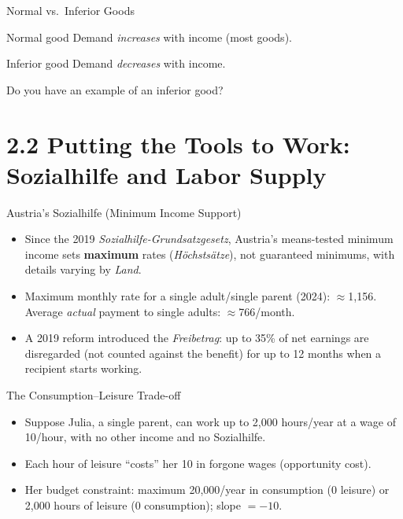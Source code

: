 \documentclass[11pt,aspectratio=169]{beamer}
\begin{document}
\begin{frame}{Normal vs.\ Inferior Goods}
  \begin{block}{Normal good}
    Demand \emph{increases} with income (most goods).
  \end{block}
  \begin{block}{Inferior good}
    Demand \emph{decreases} with income.
  \end{block}
  \vspace{0.5em}
 
Do you have an example of an inferior good?
 
\end{frame}

\section{2.2 Putting the Tools to Work: Sozialhilfe and Labor Supply}

\begin{frame}{Austria's Sozialhilfe (Minimum Income Support)}
  \begin{itemize}
    \item Since the 2019 \emph{Sozialhilfe-Grundsatzgesetz}, Austria's means-tested minimum income sets \textbf{maximum} rates (\emph{Höchstsätze}), not guaranteed minimums, with details varying by \emph{Land}.
    \item Maximum monthly rate for a single adult/single parent (2024): \(\approx\)\texteuro{}1{,}156. Average \emph{actual} payment to single adults: \(\approx\)\texteuro{}766/month.
    \item A 2019 reform introduced the \emph{Freibetrag}: up to 35\% of net earnings are disregarded (not counted against the benefit) for up to 12 months when a recipient starts working.
  \end{itemize}
 
 
 
\end{frame}

\begin{frame}{The Consumption--Leisure Trade-off}
  \begin{itemize}
    \item Suppose Julia, a single parent, can work up to 2{,}000 hours/year at a wage of \texteuro{}10/hour, with no other income and no Sozialhilfe.
    \item Each hour of leisure ``costs'' her \texteuro{}10 in forgone wages (opportunity cost).
    \item Her budget constraint: maximum \texteuro{}20{,}000/year in consumption (0 leisure) or 2{,}000 hours of leisure (\texteuro{}0 consumption); slope $=-10$.
  \end{itemize}
\end{frame}
\end{document}
